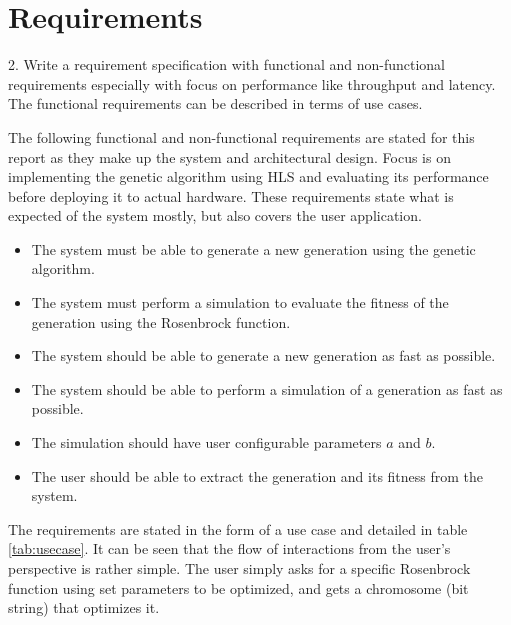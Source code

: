 \section{Requirements}\label{sec:req}

\begin{framed}
2. Write a requirement specification with functional and non-functional requirements especially with focus on performance like throughput and latency. The functional requirements can be described in terms of use cases.
\end{framed}

The following functional and non-functional requirements are stated for this report as they make up the system and architectural design. Focus is on implementing the genetic algorithm using HLS and evaluating its performance before deploying it to actual hardware. These requirements state what is expected of the system mostly, but also covers the user application.

\begin{itemize}
\item The system must be able to generate a new generation using the genetic algorithm.
\item The system must perform a simulation to evaluate the fitness of the generation using the Rosenbrock function.
\item The system should be able to generate a new generation as fast as possible.
\item The system should be able to perform a simulation of a generation as fast as possible.
\item The simulation should have user configurable parameters $a$ and $b$.
\item The user should be able to extract the generation and its fitness from the system.
\end{itemize}

The requirements are stated in the form of a use case and detailed in table \ref{tab:usecase}. It can be seen that the flow of interactions from the user's perspective is rather simple. The user simply asks for a specific Rosenbrock function using set parameters to be optimized, and gets a chromosome (bit string) that optimizes it.

